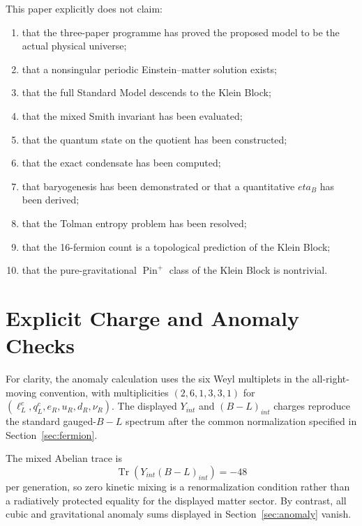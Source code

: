 \documentclass[11pt]{article}
\theoremstyle{canonmath}
\theoremstyle{canonpostulate}
\theoremstyle{canonclaim}
\providecommand{\Pin}{\operatorname{Pin}}
\def\mathrm#1{#1}%
\def\eta{eta}%
\begin{document}
\begin{excludedclaims}
This paper explicitly does not claim:
\begin{enumerate}
\item that the three-paper programme has proved the proposed model to be the actual physical universe;
\item that a nonsingular periodic Einstein--matter solution exists;
\item that the full Standard Model descends to the Klein Block;
\item that the mixed Smith invariant has been evaluated;
\item that the quantum state on the quotient has been constructed;
\item that the exact condensate has been computed;
\item that baryogenesis has been demonstrated or that a quantitative $\eta_B$ has been derived;
\item that the Tolman entropy problem has been resolved;
\item that the 16-fermion count is a topological prediction of the Klein Block;
\item that the pure-gravitational $\Pin^+$ class of the Klein Block is nontrivial.
\end{enumerate}
\end{excludedclaims}

\appendix
\section{Explicit Charge and Anomaly Checks}
\label{app:anomalies}

For clarity, the anomaly calculation uses the six Weyl multiplets in the all-right-moving convention, with multiplicities $(2,6,1,3,3,1)$ for $(\ell_L^c,q_L^c,e_R,u_R,d_R,\nu_R)$. The displayed $Y_{\mathrm{int}}$ and $(B-L)_{\mathrm{int}}$ charges reproduce the standard gauged-$B-L$ spectrum after the common normalization specified in Section~\ref{sec:fermion}.

The mixed Abelian trace is
\begin{equation}
\operatorname{Tr}\!\left(Y_{\mathrm{int}}(B-L)_{\mathrm{int}}\right)=-48
\end{equation}
per generation, so zero kinetic mixing is a renormalization condition rather than a radiatively protected equality for the displayed matter sector. By contrast, all cubic and gravitational anomaly sums displayed in Section~\ref{sec:anomaly} vanish.
\end{document}
